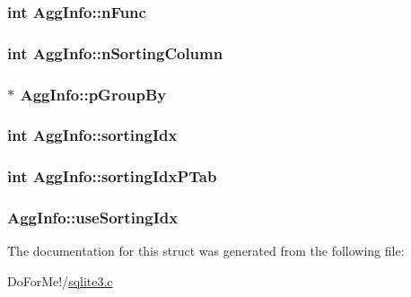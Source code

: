 \hypertarget{struct_agg_info_a5bfde7ca00d28da6edbda523ab038e38}{
\subsubsection[{n\-Func}]{\setlength{\rightskip}{0pt plus 5cm}int Agg\-Info\-::n\-Func}}\label{struct_agg_info_a5bfde7ca00d28da6edbda523ab038e38}
\hypertarget{struct_agg_info_a89925dccd1a0ec51d2a5a5dbaead66dc}{
\subsubsection[{n\-Sorting\-Column}]{\setlength{\rightskip}{0pt plus 5cm}int Agg\-Info\-::n\-Sorting\-Column}}\label{struct_agg_info_a89925dccd1a0ec51d2a5a5dbaead66dc}
\hypertarget{struct_agg_info_aa8e942103d224c4db847743670907781}{
\subsubsection[{p\-Group\-By}]{$\ast$ Agg\-Info\-::p\-Group\-By}}\label{struct_agg_info_aa8e942103d224c4db847743670907781}
\hypertarget{struct_agg_info_a97ce74f509ca908a616c123e7196797b}{
\subsubsection[{sorting\-Idx}]{\setlength{\rightskip}{0pt plus 5cm}int Agg\-Info\-::sorting\-Idx}}\label{struct_agg_info_a97ce74f509ca908a616c123e7196797b}
\hypertarget{struct_agg_info_a7faac4c3996598960fc46f0c173b244c}{
\subsubsection[{sorting\-Idx\-P\-Tab}]{\setlength{\rightskip}{0pt plus 5cm}int Agg\-Info\-::sorting\-Idx\-P\-Tab}}\label{struct_agg_info_a7faac4c3996598960fc46f0c173b244c}
\hypertarget{struct_agg_info_a8173a7ea13c4a12ce4befbcb40719073}{
\subsubsection[{use\-Sorting\-Idx}]{ Agg\-Info\-::use\-Sorting\-Idx}}\label{struct_agg_info_a8173a7ea13c4a12ce4befbcb40719073}


The documentation for this struct was generated from the following file\-:\begin{DoxyCompactItemize}
\item 
Do\-For\-Me!/\hyperlink{sqlite3_8c}{sqlite3.\-c}\end{DoxyCompactItemize}
